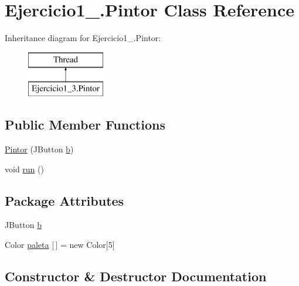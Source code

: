 \hypertarget{class_ejercicio1__3_1_1_pintor}{}\section{Ejercicio1\+\_.\+Pintor Class Reference}
\label{class_ejercicio1__3_1_1_pintor}
Inheritance diagram for Ejercicio1\+\_.\+Pintor\+:\begin{figure}[H]
\begin{center}
\leavevmode
\includegraphics[height=2.000000cm]{class_ejercicio1__3_1_1_pintor}
\end{center}
\end{figure}
\subsection*{Public Member Functions}
\begin{DoxyCompactItemize}
\item 
\mbox{\hyperlink{class_ejercicio1__3_1_1_pintor_a39fcaee031baf296f7159ac07846c0cd}{Pintor}} (J\+Button \mbox{\hyperlink{class_ejercicio1__3_1_1_pintor_a3025354dffadefccce6ca19ede04c171}{b}})
\item 
void \mbox{\hyperlink{class_ejercicio1__3_1_1_pintor_ad4d958156bfe9f43c4a54191751d4537}{run}} ()
\end{DoxyCompactItemize}
\subsection*{Package Attributes}
\begin{DoxyCompactItemize}
\item 
J\+Button \mbox{\hyperlink{class_ejercicio1__3_1_1_pintor_a3025354dffadefccce6ca19ede04c171}{b}}
\item 
Color \mbox{\hyperlink{class_ejercicio1__3_1_1_pintor_a0e0b6ca6f1510ec416a533e3d94a59e2}{paleta}} \mbox{[}$\,$\mbox{]} = new Color\mbox{[}5\mbox{]}
\end{DoxyCompactItemize}


\subsection{Constructor \& Destructor Documentation}
\mbox{\label{class_ejercicio1__3_1_1_pintor_a39fcaee031baf296f7159ac07846c0cd}} 
